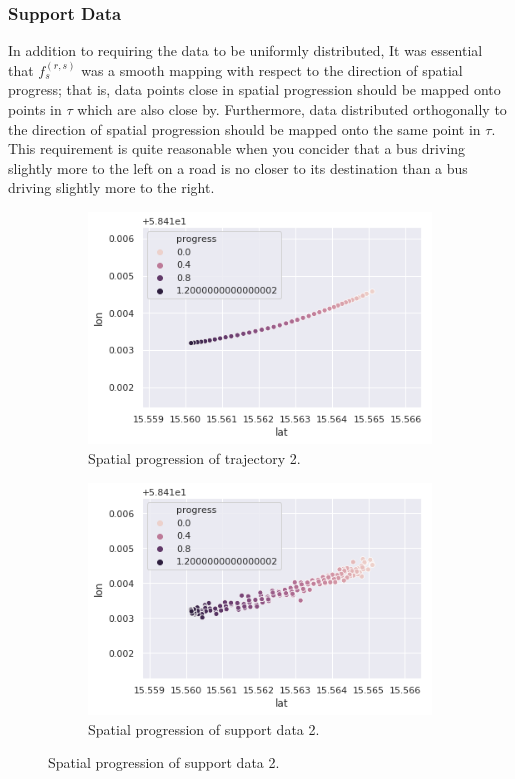 \subsubsection{Support Data}
In addition to requiring the data to be uniformly distributed, It was essential that $f^{(r,s)}_s$ was a smooth mapping with respect to the direction of spatial progress; that is, data points close in spatial progression should be mapped onto points in $\tau$ which are also close by. Furthermore, data distributed orthogonally to the direction of spatial progression should be mapped onto the same point in $\tau$. This requirement is quite reasonable when you concider that a bus driving slightly more to the left on a road is no closer to its destination than a bus driving slightly more to the right.

\begin{figure}[H]
  \begin{subfigure}[b]{0.5\textwidth}
    \includegraphics[width=\textwidth]{figures/traj-without-support-data.png}
    \caption{Spatial progression of trajectory 2.}
    \label{fig:traj-without-support-data}
  \end{subfigure}
  \begin{subfigure}[b]{0.5\textwidth}
    \includegraphics[width=\textwidth]{figures/traj-with-support-data.png}
    \caption{Spatial progression of support data 2.}
    \label{fig:traj-with-support-data}
  \end{subfigure}
\end{figure}

